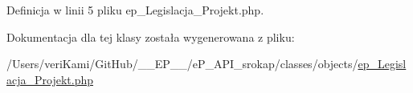 Definicja w linii 5 pliku ep\-\_\-\-Legislacja\-\_\-\-Projekt.\-php.



Dokumentacja dla tej klasy została wygenerowana z pliku\-:\begin{DoxyCompactItemize}
\item 
/\-Users/veri\-Kami/\-Git\-Hub/\-\_\-\-\_\-\-E\-P\-\_\-\-\_\-/e\-P\-\_\-\-A\-P\-I\-\_\-srokap/classes/objects/\hyperlink{ep___legislacja___projekt_8php}{ep\-\_\-\-Legislacja\-\_\-\-Projekt.\-php}\end{DoxyCompactItemize}
